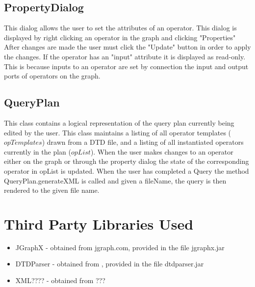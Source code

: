 \documentclass{article}
\begin{document}
\subsection{PropertyDialog} This dialog allows the user to set the attributes of an operator.  This dialog is displayed by right clicking an operator in the graph and clicking "Properties"  After changes are made the user must click the "Update" button in order to apply the changes.  If the operator has an "input" attribute it is displayed as read-only.  This is because inputs to an operator are set by connection the input and output ports of operators on the graph.
\subsection{QueryPlan}  This class contains a logical representation of the query plan currently being edited by the user.  This class maintains a listing of all operator templates ($opTemplates$) drawn from a DTD file, and a listing of all instantiated operators currently in the plan ($opList$).  When the user makes changes to an operator either on the graph or through the property dialog the state of the corresponding operator in opList is updated.  When the user has completed a Query the method QueryPlan.generateXML is called and given a fileName, the query is then rendered to the given file name.
\section{Third Party Libraries Used}
\begin{itemize}
\item JGraphX - obtained from jgraph.com, provided in the file jgraphx.jar
\item DTDParser - obtained from  , provided in the file dtdparser.jar
\item XML???? - obtained from ???
\end{itemize}
\end{document}
